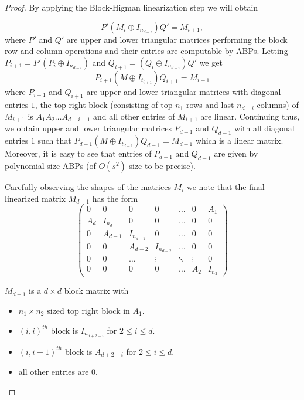 \begin{proof}
By applying the Block-Higman linearization step we will obtain

%
%
%
%
%
%
%
%

%
%
%
%
%
%
%
%

\[
P'(M_i \oplus I_{n_{d-i}})Q' = M_{i+1},
\] 
where $P'$ and $Q'$ are upper and lower triangular matrices performing
the block row and column operations and their entries are computable
by ABPs. Letting $P_{i+1} = P' (P_i \oplus I_{n_{d-i}})$ and
$Q_{i+1}= (Q_i \oplus I_{n_{d-i}}) Q'$ we get
\[
P_{i+1} (M \oplus I_{t_{i+1}}) Q_{i+1} = M_{i+1}
\]
where $P_{i+1}$ and $Q_{i+1}$ are upper and lower triangular matrices
with diagonal entries $1$, the top right block (consisting of top
$n_1$ rows and last $n_{d-i}$ columns) of $M_{i+1}$ is
$A_1A_2 \ldots A_{d-i-1}$ and all other entries of $M_{i+1}$ are
linear. Continuing thus, we obtain upper and lower triangular matrices
$P_{d-1}$ and $Q_{d-1}$ with all diagonal entries $1$ such that
$P_{d-1} (M \oplus I_{t_{d-1}})Q_{d-1}= M_{d-1}$ which is a linear
matrix. Moreover, it is easy to see that entries of $P_{d-1}$ and
$Q_{d-1}$ are given by polynomial size ABPs (of $O(s^2)$ size to be
precise).

Carefully observing the shapes of the matrices $M_i$ we note that the
final linearized matrix $M_{d-1}$ has the form
\[
\left(
\begin{array}{ccccccc}
0 & 0 & 0 & 0 & \ldots & 0 & A_1\\
%
A_d & I_{n_{d}} & 0 & 0 & \ldots & 0 & 0\\
0 & A_{d-1} & I_{n_{d-1}} & 0 & \ldots & 0 & 0 \\
0 & 0 & A_{d-2} & I_{n_{d-2}}& \ldots & 0 & 0 \\
0 & 0 & \ldots & \vdots & \ddots & \vdots & 0\\
0& 0 & 0& 0 & \ldots & A_2 & I_{n_2}
\end{array} 
\right)
\]

$M_{d-1}$ is a $d\times d$ block matrix with
\begin{itemize}
\item[-]  $n_1\times n_2$ sized top right block in $A_1$.
\item[-]  $(i,i)^{th}$ block is $I_{n_{d+2-i}}$ for $2\leq i \leq d$.
\item[-] $(i,i-1)^{th}$ block is $A_{d+2-i}$ for $2\leq i \leq d$.
\item[-] all other entries are $0$.
\end{itemize}

\end{proof}


